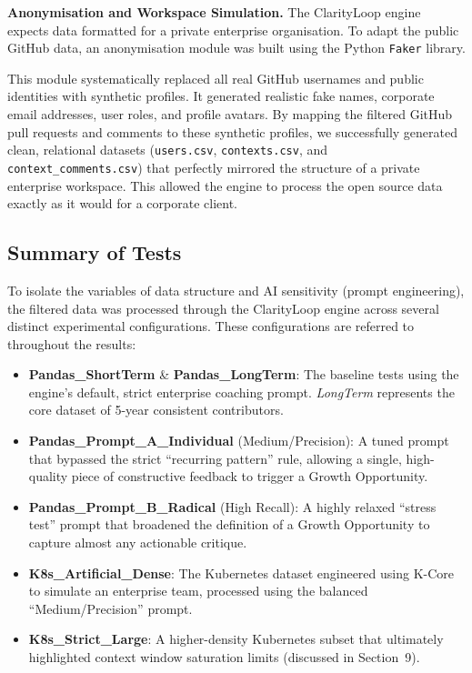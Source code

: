 \documentclass[conference]{IEEEconf}
\begin{document}
\textbf{Anonymisation and Workspace Simulation.}
The ClarityLoop engine expects data formatted for a private enterprise organisation. To adapt the public GitHub data, an anonymisation module was built using the Python \texttt{Faker} library.

This module systematically replaced all real GitHub usernames and public identities with synthetic profiles. It generated realistic fake names, corporate email addresses, user roles, and profile avatars. By mapping the filtered GitHub pull requests and comments to these synthetic profiles, we successfully generated clean, relational datasets (\texttt{users.csv}, \texttt{contexts.csv}, and \texttt{context\_comments.csv}) that perfectly mirrored the structure of a private enterprise workspace. This allowed the engine to process the open source data exactly as it would for a corporate client.

\subsection{Summary of Tests}
To isolate the variables of data structure and AI sensitivity (prompt engineering), the filtered data was processed through the ClarityLoop engine across several distinct experimental configurations. These configurations are referred to throughout the results:
\begin{itemize}
	\item \textbf{Pandas\_ShortTerm} \& \textbf{Pandas\_LongTerm}: The baseline tests using the engine's default, strict enterprise coaching prompt. \textit{LongTerm} represents the core dataset of 5-year consistent contributors.
	\item \textbf{Pandas\_Prompt\_A\_Individual} (Medium/Precision): A tuned prompt that bypassed the strict ``recurring pattern'' rule, allowing a single, high-quality piece of constructive feedback to trigger a Growth Opportunity.
	\item \textbf{Pandas\_Prompt\_B\_Radical} (High Recall): A highly relaxed ``stress test'' prompt that broadened the definition of a Growth Opportunity to capture almost any actionable critique.
	\item \textbf{K8s\_Artificial\_Dense}: The Kubernetes dataset engineered using K-Core to simulate an enterprise team, processed using the balanced ``Medium/Precision'' prompt.
	\item \textbf{K8s\_Strict\_Large}: A higher-density Kubernetes subset that ultimately highlighted context window saturation limits (discussed in Section~9).
\end{itemize}
\end{document}
